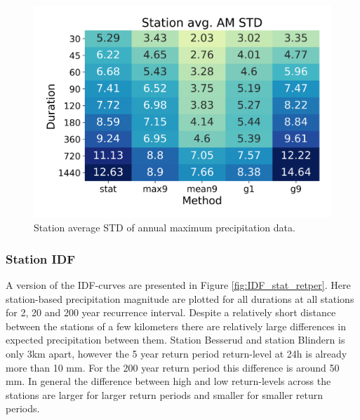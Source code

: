 \begin{figure}[hbt!]
    \centering
    \includegraphics[scale=0.4]{figures/AM_station_avg_std.png}
    \caption{Station average STD of annual maximum precipitation data.}
    \label{fig:AM_stat}
\end{figure}

\subsubsection{Station IDF}

A version of the IDF-curves are presented in Figure \ref{fig:IDF_stat_retper}. Here station-based precipitation magnitude are plotted for all durations at all stations for 2, 20 and 200 year recurrence interval. Despite a relatively short distance between the stations of a few kilometers there are relatively large differences in expected precipitation between them. Station Besserud and station Blindern is only 3km apart, however the 5 year return period return-level at 24h is already more than 10 mm. For the 200 year return period this difference is around 50 mm. In general the difference between high and low return-levels across the stations are larger for larger return periods and smaller for smaller return periods.

